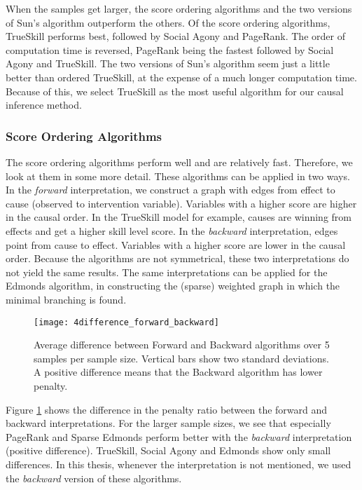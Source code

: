 When the samples get larger, the score ordering algorithms and the two versions of Sun's algorithm outperform the others. Of the score ordering algorithms, TrueSkill performs best, followed by Social Agony and PageRank. The order of computation time is reversed, PageRank being the fastest followed by Social Agony and TrueSkill. The two versions of Sun's algorithm seem just a little better than ordered TrueSkill, at the expense of a much longer computation time. Because of this, we select TrueSkill as the most useful algorithm for our causal inference method.

\subsubsection{Score Ordering Algorithms}

The score ordering algorithms perform well and are relatively fast. Therefore, we look at them in some more detail. These algorithms can be applied in two ways. In the \textit{forward} interpretation, we construct a graph with edges from effect to cause (observed to intervention variable). Variables with a higher score are higher in the causal order. In the TrueSkill model for example, causes are winning from effects and get a higher skill level score. In the \textit{backward} interpretation, edges point from cause to effect. Variables with a higher score are lower in the causal order. Because the algorithms are not symmetrical, these two interpretations do not yield the same results. The same interpretations can be applied for the Edmonds algorithm, in constructing the (sparse) weighted graph in which the minimal branching is found.

\begin{figure}[h]
    \centering
    \texttt{[image: 4difference\_forward\_backward]}
    \caption{Average difference between Forward and Backward algorithms over 5 samples per sample size. Vertical bars show two standard deviations. A positive difference means that the Backward algorithm has lower penalty.}
    \label{fig:4:forwardbackward}
\end{figure}  

Figure \ref{fig:4:forwardbackward} shows the difference in the penalty ratio between the forward and backward interpretations. For the larger sample sizes, we see that especially PageRank and Sparse Edmonds perform better with the \textit{backward} interpretation (positive difference). TrueSkill, Social Agony and Edmonds show only small differences. In this thesis, whenever the interpretation is not mentioned, we used the \textit{backward} version of these algorithms. 

